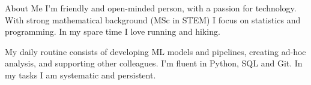 \documentclass{resume} %
\begin{document}
\begin{rSection}{About Me}
I’m friendly and open-minded person, with a passion for technology. With strong mathematical background (MSc in STEM) I focus on statistics and programming. In my spare time I love running and hiking.

My daily routine consists of developing ML models and pipelines, creating ad-hoc analysis, and supporting other colleagues. I'm fluent in Python, SQL and Git. In my tasks I am systematic and persistent.
\end{rSection}

\end{document}
